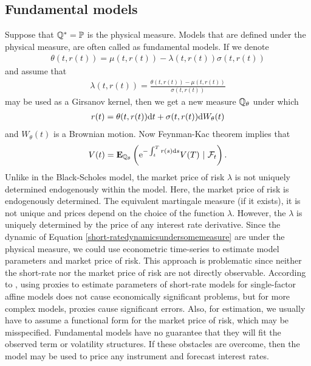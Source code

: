 \subsection{Fundamental models}

Suppose that $\mathbb{Q}^* = \mathbb{P}$ is the physical measure. Models that are defined under the physical measure, are often called as fundamental models. If we denote
	\begin{align}
		\theta(t,r(t)) = \mu(t,r(t)) - \lambda(t,r(t)) \sigma(t,r(t))
	\end{align}
and assume that
	\begin{align}
		\lambda(t,r(t)) = \frac{\theta(t,r(t)) - \mu(t,r(t))}{\sigma(t,r(t))}
	\end{align}
may be used as a Girsanov kernel, then we get a new measure $\mathbb{Q}_{\theta}$ under which
	\begin{align}
		r(t) = \theta(t,r(t)) \mathrm{d} t + \sigma(t,r(t)) \mathrm{d} W_{\theta} (t)
	\end{align}
and $W_{\theta} (t)$ is a Brownian motion. Now Feynman-Kac theorem implies that
	\begin{align}
		V(t) = \E_{\Pm_{\theta}} \left( \e^{-\int_t^T r(s) \dx s} V(T) \ | \ \F_t \right) .
	\end{align}
Unlike in the Black-Scholes model, the market price of risk $\lambda$ is not uniquely determined endogenously within the model. Here, the market price of risk is endogenously determined. The equivalent martingale measure (if it exists), it is not unique and prices depend on the choice of the function $\lambda$. However, the $\lambda$ is uniquely determined by the price of any interest rate derivative. Since the dynamic of Equation \ref{short-ratedynamicsundersomemeasure} are under the physical measure, we could use econometric time-series to estimate model parameters and market price of risk. This approach is problematic since neither the short-rate nor the market price of risk are not directly observable. According to \cite{chapmanlongpearson1999usingproxies}, using proxies to estimate parameters of short-rate models for single-factor affine models does not cause economically significant problems, but for more complex models, proxies cause significant errors. Also, for estimation, we usually have to assume a functional form for the market price of risk, which may be misspecified. Fundamental models have no guarantee that they will fit the observed term or volatility structures. If these obstacles are overcome, then the model may be used to price any instrument and forecast interest rates.

